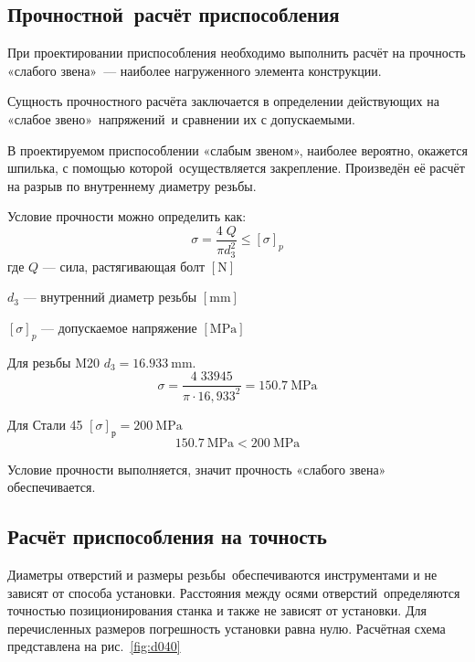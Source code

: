\documentclass[14pt,russian,a4paper]{extreport}
\begin{document}
\subsection{Прочностной расчёт приспособления}

При проектировании приспособления необходимо выполнить расчёт на прочность «слабого звена» --- наиболее нагруженного элемента конструкции.

Сущность прочностного расчёта заключается в определении действующих на «слабое звено» напряжений и сравнении их с допускаемыми.

В проектируемом приспособлении «слабым звеном», наиболее вероятно, окажется шпилька, с помощью которой осуществляется закрепление. Произведён её расчёт на разрыв по внутреннему диаметру резьбы.

Условие прочности можно определить как: \cite[форм.~14.6]{ryahovskiy:dm}
\begin{equation}
  \sigma = \frac{4 \; Q}{\pi d_3^2} \leq \left[ \sigma \right]_p
\end{equation}
где $Q$ --- сила, растягивающая болт $\left[\si{\newton}\right]$ \par
$d_3$ --- внутренний диаметр резьбы $\left[\si{\milli\meter}\right]$ \par
$\left[ \sigma \right]_p$ --- допускаемое напряжение $\left[\si{\mega\pascal}\right]$

Для резьбы M20 $ d_3 = \SI{16,933}{\milli\meter} $.
\begin{equation*}
  \sigma = \frac{4 \; 33945}{\pi \cdot 16,933^2} = \SI{150,7}{\mega\pascal}
\end{equation*}

Для Стали 45 $ \left[\sigma\right]_\text{р} = \SI{200}{\mega\pascal} $
\begin{equation*}
  \SI{150,7}{\mega\pascal} < \SI{200}{\mega\pascal}
\end{equation*}

Условие прочности выполняется, значит прочность «слабого звена» обеспечивается.

\subsection{Расчёт приспособления на точность}

Диаметры отверстий и размеры резьбы обеспечиваются инструментами и не зависят от способа установки. Расстояния между осями отверстий определяются точностью позиционирования станка и также не зависят от установки. Для перечисленных размеров погрешность установки равна нулю. Расчётная схема представлена на рис.~\ref{fig:d040}
\end{document}
